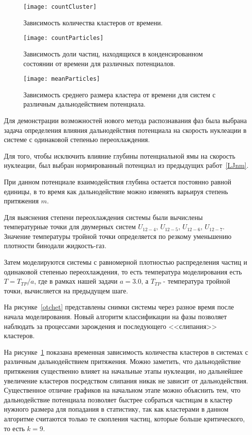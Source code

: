 \begin{figure}[!t]
    \centering
    \texttt{[image: countCluster]}
    \caption{Зависимость количества кластеров от времени.}
    \label{countCluster}
\end{figure}

\begin{figure}[!t]
    \centering
    \texttt{[image: countParticles]}
    \caption{Зависимость доли частиц, находящихся в конденсированном состоянии от времени для различных потенциалов.}
    \label{countParticles}
\end{figure}

\begin{figure}[!t]
    \centering
    \texttt{[image: meanParticles]}
    \caption{Зависимость среднего размера кластера от времени для систем с различным дальнодействием потенциала.}
    \label{meanParticles}
\end{figure}

Для демонстрации возможностей нового метода распознавания фаз была выбрана задача определения влияния дальнодействия потенциала на скорость нуклеации в системе с одинаковой степенью переохлаждения.

Для того, чтобы исключить влияние глубины потенциальной ямы на скорость нуклеации, был выбран нормированный потенциал из предыдущих работ~\ref{LJnm}.

При данном потенциале взаимодействия глубина остается постоянно равной единицы, в то время как дальнодействие можно изменять варьируя степень притяжения $m$.

Для выяснения степени переохлаждения системы были вычислены температурные точки для двумерных систем $U_{12-4}$, $U_{12-5}$, $U_{12-6}$, $U_{12-7}$. Значение температуры тройной точки определяется по резкому уменьшению плотности бинодали жидкость-газ.

Затем моделируются системы с равномерной плотностью распределения частиц и одинаковой степенью переохлаждения, то есть температура моделирования есть $T = T_{TP} / a$, где в рамках нашей задачи $a = 3.0$, а $T_{TP}$ - температура тройной точки, вычисляется на предыдущем шаге.

На рисунке~\ref{otchet} представлены снимки системы через разное время после начала моделирования. Новый алгоритм классификации на фазы позволяет наблюдать за процессами зарождения и последующего <<слипания>> кластеров.


На рисунке~\ref{countCluster} показана временная зависимость количества кластеров в системах с различным дальнодействием притяжения. Можно заметить, что дальнодействие притяжения существенно влияет на начальные этапы нуклеации, но дальнейшее увеличение кластеров посредством слипания никак не зависит от дальнодействия. Существенное отличие графиков на начальном этапе можно объяснить тем, что дальнодействие потенциала позволяет быстрее собраться частицам в кластер нужного размера для попадания в статистику, так как кластерами в данном алгоритме считаются только те скопления частиц, которые больше критического, то есть $k = 9$.


